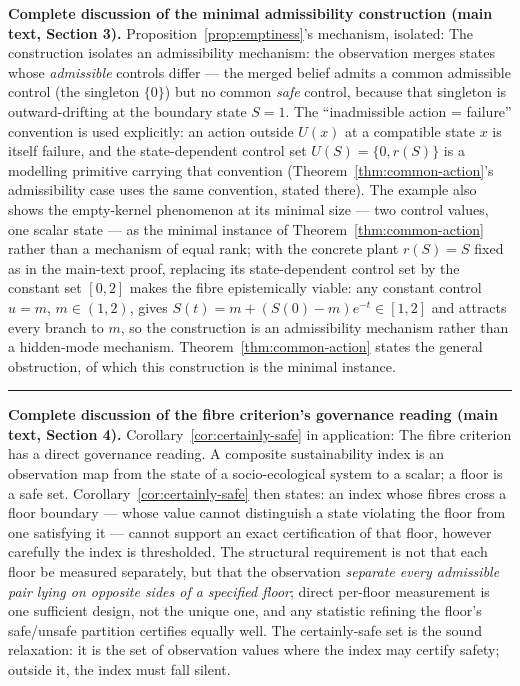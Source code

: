 \documentclass[11pt]{article}
\theoremstyle{definition}
\begin{document}
\bigskip
\noindent\textbf{Complete discussion of the minimal admissibility construction (main text, Section 3).}
Proposition~\ref{prop:emptiness}'s mechanism, isolated:
The construction isolates an admissibility mechanism: the observation merges states whose \emph{admissible}
controls differ --- the merged belief admits a common admissible control
(the singleton \(\{0\}\)) but no common \emph{safe} control, because
that singleton is outward-drifting at the boundary state \(S = 1\). The
``inadmissible action = failure'' convention is used explicitly: an action outside \(U(x)\) at a compatible state \(x\) is
itself failure, and the state-dependent control set
\(U(S) = \{0, r(S)\}\) is a modelling primitive carrying that convention
(Theorem~\ref{thm:common-action}'s admissibility case uses the same convention, stated there).
The example also shows the empty-kernel phenomenon at its minimal size
--- two control values, one scalar state --- as the minimal instance of
Theorem~\ref{thm:common-action} rather than a mechanism of equal rank; with the concrete plant \(r(S)=S\) fixed as in the main-text proof,
replacing its state-dependent control set by the constant set \([0,2]\)
makes the fibre epistemically viable: any constant control \(u=m\), \(m \in (1,2)\),
gives \(S(t)=m+(S(0)-m)e^{-t}\in[1,2]\) and attracts every branch to \(m\), so the construction is an admissibility mechanism rather than a hidden-mode mechanism. Theorem~\ref{thm:common-action} states the general obstruction, of which this construction is
the minimal instance.
\rule{0.5\linewidth}{0.5pt}

\bigskip
\noindent\textbf{Complete discussion of the fibre criterion's governance reading (main text, Section 4).}
Corollary~\ref{cor:certainly-safe} in application:
The fibre criterion has a direct governance reading. A composite
sustainability index is an observation map from the state of a
socio-ecological system to a scalar; a floor is a safe set. Corollary~\ref{cor:certainly-safe}
then states: an index whose fibres cross a floor boundary --- whose
value cannot distinguish a state violating the floor from one satisfying
it --- cannot support an exact certification of that floor, however
carefully the index is thresholded. The structural requirement is not
that each floor be measured separately, but that the observation
\emph{separate every admissible pair lying on opposite sides of a specified floor}; direct per-floor measurement is one sufficient design,
not the unique one, and any statistic refining the floor's safe/unsafe
partition certifies equally well. The certainly-safe set is the sound relaxation: it is the set of observation values where the index may certify safety; outside
it, the index must fall silent.
\end{document}
